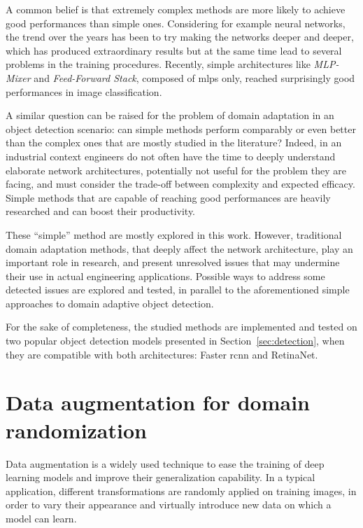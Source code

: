 \documentclass[%
    corpo=12pt,
    twoside,
    stile=classica,   
    tipotesi=magistrale,
    evenboxes,
    english,
	numerazioneromana,
]{toptesi}
\newcommand{\quotes}[1]{``#1''}
\begin{document}
\bigskip
A common belief is that extremely complex methods are more likely to achieve good performances than simple ones. Considering for example neural networks, the trend over the years has been to try making the networks deeper and deeper, which has produced extraordinary results but at the same time lead to several problems in the training procedures. Recently, simple architectures like \textit{MLP-Mixer}\cite{tolstikhin2021mlpmixer} and \textit{Feed-Forward Stack}\cite{melaskyriazi2021need}, composed of \glspl{mlp} only, reached surprisingly good performances in image classification.

A similar question can be raised for the problem of domain adaptation in an object detection scenario: can simple methods perform comparably or even better than the complex ones that are mostly studied in the literature? Indeed, in an industrial context engineers do not often have the time to deeply understand elaborate network architectures, potentially not useful for the problem they are facing, and must consider the trade-off between complexity and expected efficacy. Simple methods that are capable of reaching good performances are heavily researched and can boost their productivity.

\bigskip
These \quotes{simple} method are mostly explored in this work. However, traditional domain adaptation methods, that deeply affect the network architecture, play an important role in research, and present unresolved issues that may undermine their use in actual engineering applications. Possible ways to address some detected issues are explored and tested, in parallel to the aforementioned simple approaches to domain adaptive object detection.

\bigskip
For the sake of completeness, the studied methods are implemented and tested on two popular object detection models presented in Section~\ref{sec:detection}, when they are compatible with both architectures: Faster \gls{rcnn} and RetinaNet.

\section{Data augmentation for domain randomization}\label{sec:dataaug}
Data augmentation is a widely used technique to ease the training of deep learning models and improve their generalization capability. In a typical application, different transformations are randomly applied on training images, in order to vary their appearance and virtually introduce new data on which a model can learn.
\end{document}
